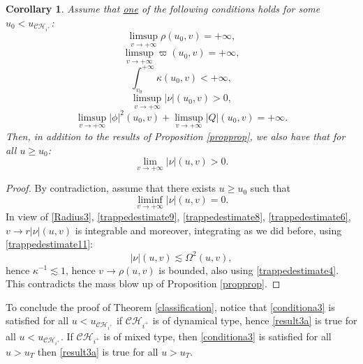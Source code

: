 \documentclass[10pt,a4paper]{article}
\theoremstyle{plain}
\newtheorem{cor}[thm]{Corollary}
\theoremstyle{remark}
\theoremstyle{definition}
\theoremstyle{plain}
\theoremstyle{remark}
\theoremstyle{definition}
\newcommand{\CH}{\mathcal{CH}_{i^+}}
\numberwithin{equation}{section}
\begin{document}
\begin{cor}
	Assume that \underline{one} of the following conditions holds for some $u_0 <u_{\CH}$: \begin{equation} \label{condition1a}
	\limsup_{v \rightarrow+\infty} \rho(u_0,v)=+\infty,
	\end{equation}  \begin{equation} \label{condition2a}
	\limsup_{v \rightarrow+\infty} \varpi(u_0,v)=+\infty,
	\end{equation} \begin{equation} \label{conditiona3}
	\int_{v_0}^{+\infty} \kappa(u_0,v) <+\infty,
	\end{equation} \begin{equation} \label{condition4a}
	\limsup_{v \rightarrow+\infty} |\nu|(u_0,v) >0,
	\end{equation}\begin{equation} \label{condition5a}
	\limsup_{v \rightarrow+\infty} |\phi|^2(u_0,v)+ \limsup_{v \rightarrow+\infty} |Q|(u_0,v)=+\infty.
	\end{equation}
	Then, in addition to the results of Proposition \ref{propprop}, we also have that for all $u \geq u_0$:  \begin{equation} \label{result3a}
	\lim_{v \rightarrow+\infty} |\nu|(u,v) >0.
	\end{equation}  
\end{cor}

\begin{proof} By contradiction, assume that there exists $u \geq u_0$ such that \begin{equation} \label{contrad}
	\liminf_{v \rightarrow+\infty} |\nu|(u,v) =0.
	\end{equation}  In view of \eqref{Radius3}, \eqref{trappedestimate9}, \eqref{trappedestimate8}, \eqref{trappedestimate6}, $ v \rightarrow r |\nu|(u,v)$ is integrable and moreover,  integrating as we did before, using \eqref{trappedestimate11}:  $$ |\nu|(u,v) \lesssim \Omega^2(u,v),$$
	hence $\kappa^{-1} \lesssim 1$, hence $v \rightarrow \rho(u,v)$ is bounded, also using \eqref{trappedestimate4}. This contradicts the mass blow up of Proposition \ref{propprop}.
\end{proof}

To conclude the proof of Theorem \ref{classification}, notice that \eqref{conditiona3} is satisfied for all $u < u_{\CH}$ if $\CH$ is of dynamical type, hence \eqref{result3a} is true for all $u < u_{\CH}$. If $\CH$ is of mixed type, then \eqref{conditiona3} is satisfied for all $u>u_T$ then \eqref{result3a} is true for all $u > u_T$.
\end{document}
